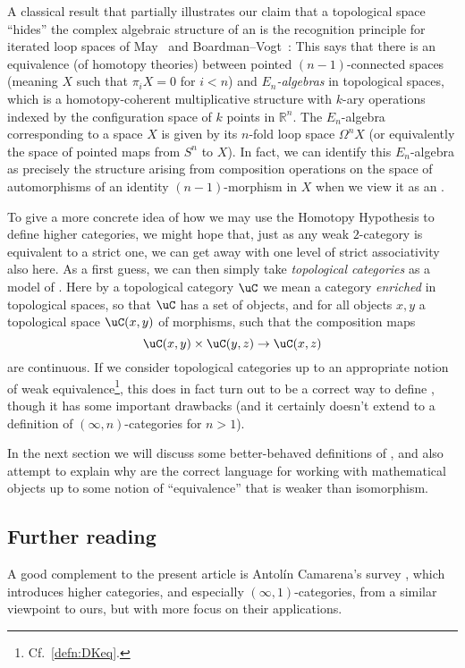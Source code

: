 \documentclass[a4paper,12pt]{article}
\begin{document}
\begin{remark}
  A classical result that partially illustrates our claim that a
  topological space ``hides'' the complex algebraic structure of an
  \igpd{} is the recognition principle for iterated loop spaces of
  May~\cite{May} and Boardman--Vogt~\cite{BoardmanVogt}: This says
  that there is an equivalence (of homotopy theories) between pointed
  $(n-1)$-connected spaces (meaning $X$ such that $\pi_{i}X = 0$ for
  $i < n$) and \emph{$E_{n}$-algebras} in topological spaces, which is
  a homotopy-coherent multiplicative structure with $k$-ary operations
  indexed by the configuration space of $k$ points in
  $\mathbb{R}^{n}$. The $E_{n}$-algebra corresponding to a space $X$
  is given by its $n$-fold loop space $\Omega^{n}X$ (or equivalently
  the space of pointed maps from $S^{n}$ to $X$). In fact, we can
  identify this $E_{n}$-algebra as precisely the structure arising
  from composition operations on the space of automorphisms of an
  identity $(n-1)$-morphism in $X$ when we view it as an \igpd{}.
\end{remark}

To give a more concrete idea of how we may use the Homotopy Hypothesis
to define higher categories, we might hope that, just as any weak
$2$-category is equivalent to a strict one, we can get away with one
level of strict associativity also here. As a first guess, we can then
simply take \emph{topological categories} as a model of \icats{}. Here
by a topological category $\uC$ we mean a category \emph{enriched} in
topological spaces, so that $\uC$ has a set of objects, and for all
objects $x,y$ a topological space $\uC(x,y)$ of morphisms, such that
the composition maps
\[ \uC(x,y) \times \uC(y,z) \to \uC(x,z)\] are continuous. If we
consider topological categories up to an appropriate notion of weak
equivalence\footnote{Cf.~\cref{defn:DKeq}.}, this does in fact turn
out to be a correct way to define \icats{}, though it has some
important drawbacks (and it certainly doesn't extend to a definition
of $(\infty,n)$-categories for $n > 1$).

In the next section we will discuss some better-behaved definitions of
\icats{}, and also attempt to explain why \icats{} are the correct
language for working with mathematical objects up to some notion of
``equivalence'' that is weaker than isomorphism.

\subsection{Further reading}
A good complement to the present article is Antol\'in Camarena's
survey \cite{Omar}, which introduces higher categories, and
especially $(\infty,1)$-categories, from a similar viewpoint to ours,
but with more focus on their applications.
\end{document}
